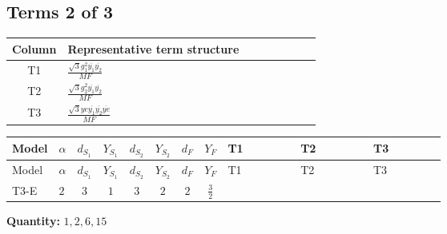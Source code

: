 \documentclass[8pt]{article}
\begin{document}
\begin{landscape}
\subsection*{Terms 2 of 3}
\begin{center}
\begin{tabular}{@{}c >{\raggedright\arraybackslash}p{0.82\linewidth}@{}}
\toprule
Column & Representative term structure \\
\midrule
T1 & \(\displaystyle \frac{\sqrt{3} g_{1}^{2} \overline{y_{1}} \overline{y_{2}}}{MF}\) \\
\midrule
T2 & \(\displaystyle \frac{\sqrt{3} g_{2}^{2} \overline{y_{1}} \overline{y_{2}}}{MF}\) \\
\midrule
T3 & \(\displaystyle \frac{\sqrt{3} ye \overline{y_{1}} \overline{y_{2}} \overline{ye}}{MF}\) \\
\midrule
\bottomrule
\end{tabular}
\end{center}
\smallskip
\tiny
\begin{longtable}{@{}llcccccc >{\raggedright\arraybackslash}p{0.21\linewidth} >{\raggedright\arraybackslash}p{0.21\linewidth} >{\raggedright\arraybackslash}p{0.21\linewidth}@{}}
\toprule
Model & $\alpha$ & $d_{S_1}$ & $Y_{S_1}$ & $d_{S_2}$ & $Y_{S_2}$ & $d_F$ & $Y_F$ & T1 & T2 & T3 \\
\midrule
\endfirsthead
\toprule
Model & $\alpha$ & $d_{S_1}$ & $Y_{S_1}$ & $d_{S_2}$ & $Y_{S_2}$ & $d_F$ & $Y_F$ & T1 & T2 & T3 \\
\midrule
\endhead
T3-E & $2$ & $3$ & $1$ & $3$ & $2$ & $2$ & $\frac{3}{2}$ & \scriptsize\adjustbox{max width=\linewidth}{$\begin{gathered} \frac{9 \sqrt{3} g_{1}^{2} \overline{y_{1}} \overline{y_{2}}}{8 MF}\end{gathered}$} & \scriptsize\adjustbox{max width=\linewidth}{$\begin{gathered} \frac{15 \sqrt{3} g_{2}^{2} \overline{y_{1}} \overline{y_{2}}}{8 MF}\end{gathered}$} & \scriptsize\adjustbox{max width=\linewidth}{$\begin{gathered} - \frac{\sqrt{3} ye \overline{y_{1}} \overline{y_{2}} \overline{ye}}{12 MF}\end{gathered}$} \\
\midrule
\bottomrule
\end{longtable}
\clearpage
\noindent\textbf{Quantity: }$\mathrm{1,2,6,15}$\par\smallskip

\end{landscape}
\end{document}
